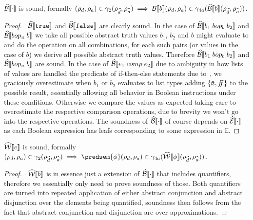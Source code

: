 \begin{conjecture}\label{thm:sound-bool}
    $\widehat{\mathcal{B}}\llbracket \cdot \rrbracket$ is sound, formally $(\rho_d, \rho_a) \in \gamma_2(\rho_{\widehat{d}}, \rho_{\widehat{a}}) \implies \mathcal{B}\llbracket b \rrbracket(\rho_d, \rho_a) \in \gamma_{4a}(\widehat{\mathcal{B}}\llbracket b \rrbracket(\rho_{\widehat{d}}, \rho_{\widehat{a}}))$.
\end{conjecture}
\begin{proof}
    \pfsketch\
    $\widehat{\mathcal{B}}\llbracket \texttt{true} \rrbracket$ and $\widehat{\mathcal{B}}\llbracket \texttt{false} \rrbracket$ are clearly sound.
    In the case of $\widehat{\mathcal{B}}\llbracket b_1 \; bop_b \; b_2 \rrbracket$ and $\widehat{\mathcal{B}}\llbracket bop_u \; b \rrbracket$ we take all possible abstract truth values $b_1$, $b_2$ and $b$ might evaluate to and do the operation on all combinations, for each such pairs (or values in the case of $b$) we derive all possible abstract truth values.
    Therefore $\widehat{\mathcal{B}}\llbracket b_1 \; bop_b \; b_2 \rrbracket$ and $\widehat{\mathcal{B}}\llbracket bop_u \; b \rrbracket$ are sound.
    In the case of $\widehat{\mathcal{B}}\llbracket e_1 \; comp \; e_2 \rrbracket$ due to ambiguity in how lists of values are handled the predicate of if-then-else statements due to~\cite{halder_abstract_2012}, we graciously overestimate when $b_1$ or $b_2$ evaluates to list types adding $\{t\!t, f\!\!f\}$ to the possible result, essentially allowing all behavior in Boolean instructions under these conditions.
    Otherwise we compare the values as expected taking care to overestimate the respective comparison operations, due to brevity we won't go into the respective operations.
    The soundness of $\widehat{\mathcal{B}}\llbracket \cdot \rrbracket$ of course depends on $\widehat{\mathcal{E}}\llbracket \cdot \rrbracket$ as each Boolean expression has leafs corresponding to some expression in $\mathbb{E}$.
\end{proof}

\begin{conjecture}\label{thm:sound-exp}
    $\widehat{\mathcal{W}}\llbracket e \rrbracket$ is sound, formally $(\rho_d, \rho_a) \in \concrete_2(\env{\ab{d}}, \env{\ab{a}}) \implies \predsem{\phi}(\rho_d, \rho_a) \in \concrete_{4a}(\abspredsem{\phi}(\env{\ab{d}}, \env{\ab{a}}))$.
\end{conjecture}
\begin{proof}
    \pfsketch\
    $\widehat{\mathcal{W}}\llbracket b \rrbracket$ is in essence just a extension of $\widehat{\mathcal{B}}\llbracket \cdot \rrbracket$ that includes quantifiers, therefore we essentially only need to prove soundness of those.
    Both quantifiers are turned into repeated application of either abstract conjunction and abstract disjunction over the elements being quantified, soundness then follows from the fact that abstract conjunction and disjunction are over approximations.
\end{proof}

